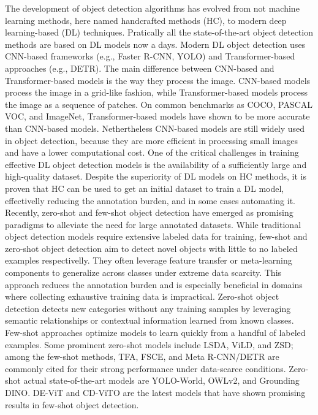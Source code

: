 \documentclass[journal,article,submit,pdftex,moreauthors]{Definitions/mdpi}
\begin{document}
The development of object detection algorithms has evolved from not machine learning methods, 
here named handcrafted methods (HC), to modern deep learning-based (DL) techniques.
Pratically all the state-of-the-art object detection methods are based on DL models
now a days.
Modern DL object detection uses CNN-based frameworks (e.g., Faster R-CNN, YOLO) 
and Transformer-based approaches (e.g., DETR).
The main difference between CNN-based and Transformer-based models is the way they
process the image. CNN-based models process the image in a grid-like fashion,
while Transformer-based models process the image as a sequence of patches.
On common benchmarks as COCO, PASCAL VOC, and ImageNet, Transformer-based models have shown 
to be more accurate than CNN-based models.
Nethertheless CNN-based models are still widely used in object detection, because they are
more efficient in processing small images and have a lower computational cost. 
One of the critical challenges in training effective DL object detection models is 
the availability of a sufficiently large and high-quality dataset. 
Despite the superiority of DL models on HC methods, it is proven that HC can be used 
to get an initial dataset to train a DL model, effectivelly reducing the annotation burden, 
and in some cases automating it.
Recently, zero-shot and few-shot object detection have emerged as promising paradigms
to alleviate the need for large annotated datasets.
While traditional object detection models require extensive labeled data for training, 
few-shot and zero-shot object detection aim to detect novel objects with little to 
no labeled examples respectivelly.
They often leverage feature transfer or meta-learning components to generalize 
across classes under extreme data scarcity. This approach reduces the annotation 
burden and is especially beneficial in domains where collecting exhaustive training 
data is impractical.
Zero-shot object detection detects new categories without any training samples by 
leveraging semantic relationships or contextual information learned from known classes. 
Few-shot approaches optimize models to learn quickly from a handful of labeled examples. 
Some prominent zero-shot models include LSDA, ViLD, and ZSD; among the few-shot methods, 
TFA, FSCE, and Meta R-CNN/DETR are commonly cited for their strong performance 
under data-scarce conditions.
Zero-shot actual state-of-the-art models are YOLO-World, OWLv2, and Grounding DINO.  
DE-ViT and CD-ViTO are the latest models that have shown promising results in few-shot
object detection.
\end{document}
